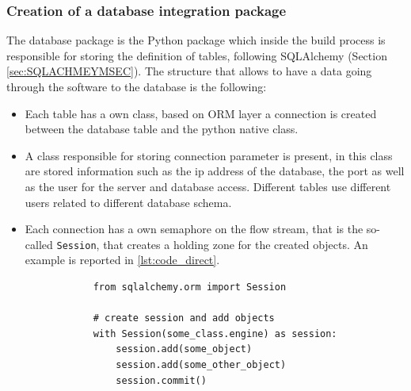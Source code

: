 \documentclass[../main.tex]{subfiles}
\begin{document}
\subsubsection{Creation of a database integration package}
The database package is the Python package which inside the build process is responsible for storing the definition of tables, following SQLAlchemy (Section \ref{sec:SQLACHMEYMSEC}).
The structure that allows to have a data going through the software to the database is the following:
\begin{itemize}
    \item Each table has a own class, based on \gls{ORM} layer a connection is created between the database table and the python native class. 
    \item A class responsible for storing connection parameter is present, in this class are stored information such as the ip address of the database, the port as well as the user for the server and database access. Different tables use different users related to different database schema. 
    \item Each connection has a own semaphore on the flow stream, that is the so-called \texttt{Session}, that creates a holding zone for the created objects. An example is reported in \ref{lst:code_direct}.
        \lstset{language=Python}
        \lstset{frame=lines}
        \lstset{basicstyle=\footnotesize}
        \begin{lstlisting}
            from sqlalchemy.orm import Session
            
            # create session and add objects
            with Session(some_class.engine) as session:
                session.add(some_object)
                session.add(some_other_object)
                session.commit()
        \end{lstlisting}
\end{itemize}
\end{document}
